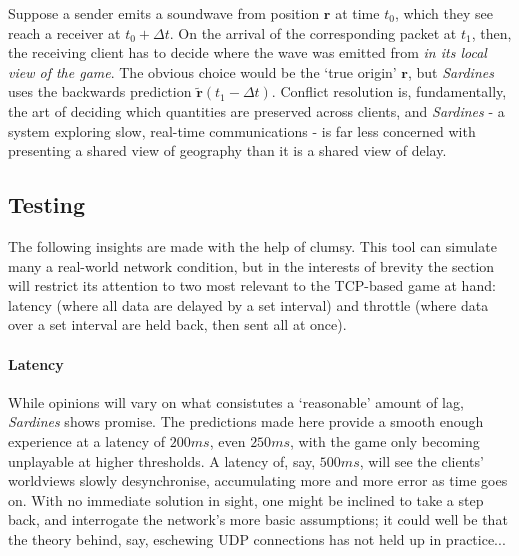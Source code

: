 \documentclass[a4paper, 9pt]{article}
\begin{document}
\begin{flushleft}
\vspace{5pt}\noindent
Suppose a sender emits a soundwave from position $\mathbf{r}$ at time $t_0$, which they see reach a receiver at $t_0+\Delta t$. On the arrival of the corresponding packet at $t_1$, then, the receiving client has to decide where the wave was emitted from \textit{in its local view of the game}. The obvious choice would be the `true origin' $\mathbf{r}$, but \textit{Sardines} uses the backwards prediction $\mathbf{\tilde{r}}(t_1-\Delta t)$. Conflict resolution is, fundamentally, the art of deciding which quantities are preserved across clients, and \textit{Sardines} - a system exploring slow, real-time communications - is far less concerned with presenting a shared view of geography than it is a shared view of delay.

\subsection*{Testing}\label{Testing}

\vspace{5pt}\noindent
The following insights are made with the help of clumsy. %
This tool can simulate many a real-world network condition, but in the interests of brevity the section will restrict its attention to two most relevant to the TCP-based game at hand: latency (where all data are delayed by a set interval) and throttle (where data over a set interval are held back, then sent all at once).

\paragraph{Latency} While opinions will vary on what consistutes a `reasonable' amount of lag, \textit{Sardines} shows promise. The predictions made here provide a smooth enough experience at a latency of $200ms$, even $250ms$, with the game only becoming unplayable at higher thresholds. A latency of, say, $500ms$, will see the clients' worldviews slowly desynchronise, accumulating more and more error as time goes on. With no immediate solution in sight, one might be inclined to take a step back, and interrogate the network's more basic assumptions; it could well be that the theory behind, say, eschewing UDP connections has not held up in practice...%



\end{flushleft}
\end{document}
